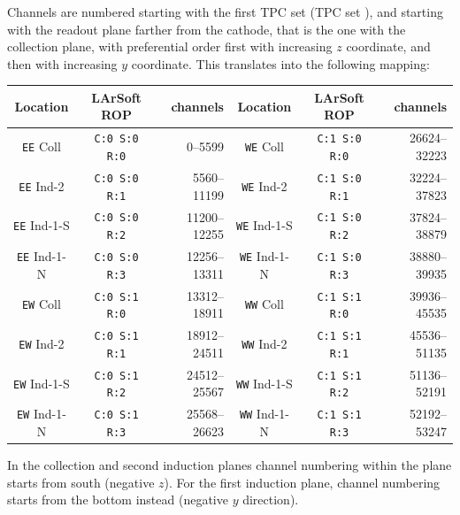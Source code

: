 Channels are numbered starting with the first TPC set (TPC set ),
and starting with the readout plane farther from the cathode,
that is the one with the collection plane, with preferential order first with
increasing $z$ coordinate, and then with increasing $y$ coordinate.
This translates into the following mapping:
\begin{center}
  \small
  \begin{tabular}{|ccr||ccr|}
    \hline
    \hline
    Location            & LArSoft ROP          & channels     & Location            & LArSoft ROP          & channels     \\
    \hline
    \texttt{EE} Coll    & \texttt{C:0 S:0 R:0} &     0--5599  & \texttt{WE} Coll    & \texttt{C:1 S:0 R:0} & 26624--32223 \\
    \texttt{EE} Ind-2   & \texttt{C:0 S:0 R:1} &  5560--11199 & \texttt{WE} Ind-2   & \texttt{C:1 S:0 R:1} & 32224--37823 \\
    \texttt{EE} Ind-1-S & \texttt{C:0 S:0 R:2} & 11200--12255 & \texttt{WE} Ind-1-S & \texttt{C:1 S:0 R:2} & 37824--38879 \\
    \texttt{EE} Ind-1-N & \texttt{C:0 S:0 R:3} & 12256--13311 & \texttt{WE} Ind-1-N & \texttt{C:1 S:0 R:3} & 38880--39935 \\
    \hline
    \texttt{EW} Coll    & \texttt{C:0 S:1 R:0} & 13312--18911 & \texttt{WW} Coll    & \texttt{C:1 S:1 R:0} & 39936--45535 \\
    \texttt{EW} Ind-2   & \texttt{C:0 S:1 R:1} & 18912--24511 & \texttt{WW} Ind-2   & \texttt{C:1 S:1 R:1} & 45536--51135 \\
    \texttt{EW} Ind-1-S & \texttt{C:0 S:1 R:2} & 24512--25567 & \texttt{WW} Ind-1-S & \texttt{C:1 S:1 R:2} & 51136--52191 \\
    \texttt{EW} Ind-1-N & \texttt{C:0 S:1 R:3} & 25568--26623 & \texttt{WW} Ind-1-N & \texttt{C:1 S:1 R:3} & 52192--53247 \\
    \hline
    \hline
  \end{tabular}
\end{center}
In the collection and second induction planes channel numbering within the plane
starts from south (negative $z$).
For the first induction plane, channel numbering starts from the bottom instead
(negative $y$ direction).



